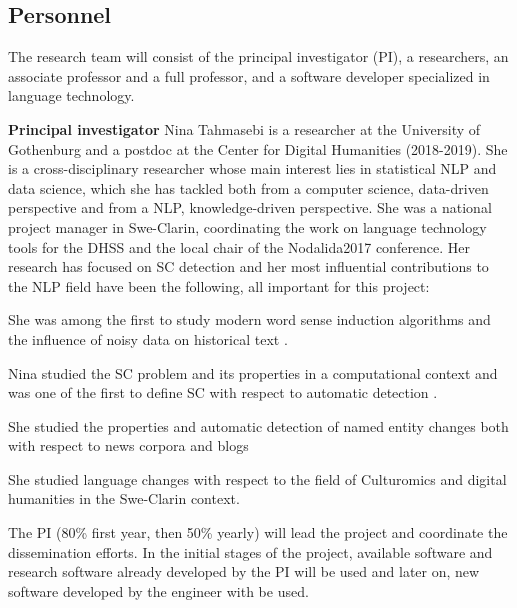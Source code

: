 \documentclass[12pt,twoside,a4paper]{article}
\begin{document}
	
	\subsection*{Personnel}
	The research team will consist of the principal investigator (PI), a researchers, an associate professor and a full professor, and a software developer specialized in language technology.
	
	\textbf{Principal investigator}  Nina Tahmasebi is a researcher at the University of Gothenburg and a postdoc at the Center for Digital Humanities (2018-2019). She is a cross-disciplinary researcher whose main interest lies in statistical NLP and data science, which she has tackled both from a computer science, data-driven perspective and from a NLP, knowledge-driven perspective.  She was a national project manager in Swe-Clarin, coordinating the work on language technology tools for the DHSS and the local chair of the Nodalida2017 conference. Her research has focused on SC detection and her most influential contributions to the NLP field have been the following, all important for this project:
	
	
	\begin{compactitem}
		\item She was among the first to study modern word sense induction algorithms and the influence of noisy data  on historical text \citep{IJDL}. 
		\item Nina studied the SC problem and its properties in a computational context \citep{evodyn, TahmasebiTPDL, TahmasebiRoleofLE} and was one of the first to define SC with respect to automatic detection \citep{Tahmasebi09Automatic, tahmasebi2013models, Tahmasebi-RANLP2017}.
		\item She studied the properties and automatic detection of named entity changes both with respect to news corpora \citep{ourColingPaper} and blogs \citep{Holzmann-Helge2015-5}
		\item She studied language changes with respect to the field of Culturomics \citep{Tahmasebi-Nina2015-10} and digital humanities \citep{Tahmasebi-Nina2016-6,Borin-Lars2017} in the Swe-Clarin context. 
	\end{compactitem}
	
	The PI (80\% first year, then 50\% yearly) will lead the project and coordinate the dissemination efforts. In the initial stages of the project, available software and research software already developed by the PI will be used and later on, new software developed by the engineer with be used.  %
	
\end{document}
